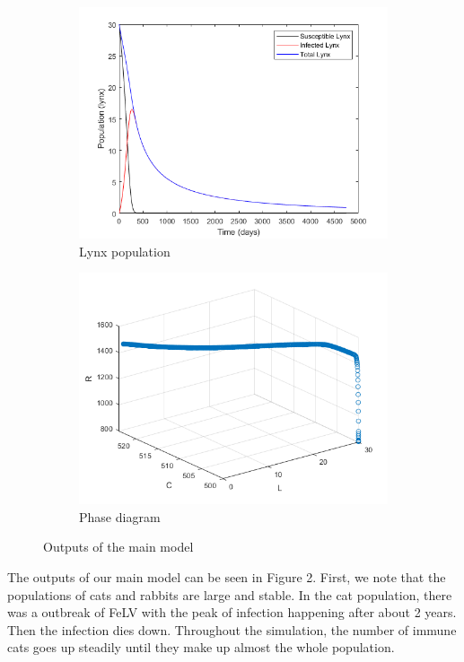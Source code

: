 \documentclass[12pt]{article}
\begin{document}
\begin{figure}[!ht]
\begin{subfigure}{0.45\textwidth}
        \centering
        \includegraphics[width=\textwidth]{images/main_L.png}
        \caption{Lynx population}
    \end{subfigure}
    \begin{subfigure}{0.45\textwidth}
        \centering
        \includegraphics[width=\textwidth]{images/main_phase.png}
        \caption{Phase diagram}
    \end{subfigure}
\caption{Outputs of the main model}
\end{figure}

\quad The outputs of our main model can be seen in Figure 2. First, we note that the populations of cats and rabbits are large and stable. In the cat population, there was a outbreak of FeLV with the peak of infection happening after about 2 years. Then the infection dies down. Throughout the simulation, the number of immune cats goes up steadily until they make up almost the whole population. 
\end{document}
